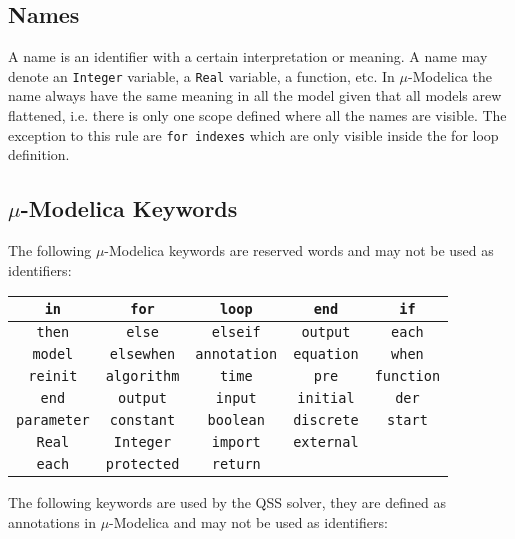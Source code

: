 \documentclass[11pt,a4paper,notitlepage]{report}
\begin{document}
\subsection{Names}

A name is an identifier with a certain interpretation or meaning. A name may denote an \verb"Integer"
variable, a \verb"Real" variable, a function, etc. In $\mu$-Modelica the name always have the same meaning in all the model given that all models arew flattened, i.e. there is only one scope defined where all the names are visible. The exception to this rule are \verb"for indexes" which are only visible inside the for loop definition.

\subsection{$\mu$-Modelica Keywords}

\FloatBarrier
The following $\mu$-Modelica keywords are reserved words and may not be used as identifiers:
\begin{center}
\begin{tabular}{|c|c|c|c|c|}
	\hline
	\verb"in" & \verb"for" & \verb"loop" & \verb"end" & \verb"if" \\	
	\hline
	\verb"then" & \verb"else" & \verb"elseif" & \verb"output" & \verb"each" \\
	\hline
	\verb"model" & \verb"elsewhen" & \verb"annotation" & \verb"equation" & \verb"when" \\
	\hline	
	\verb"reinit" & \verb"algorithm" & \verb"time" & \verb"pre" & \verb"function" \\
	\hline 	 
	\verb"end" & \verb"output" & \verb"input" & \verb"initial" & \verb"der" \\ 
	\hline	
	\verb"parameter" & \verb"constant" & \verb"boolean" & \verb"discrete" & \verb"start" \\
	\hline
	\verb"Real" & \verb"Integer" & \verb"import" & \verb"external"  &  \\
	\hline
	\verb"each" & \verb"protected" & \verb"return" & \verb""  &  \\
	\hline
\end{tabular}
\end{center}

\FloatBarrier
The following keywords are used by the QSS solver, they are defined as annotations in $\mu$-Modelica and may not be used as identifiers:
\end{document}
